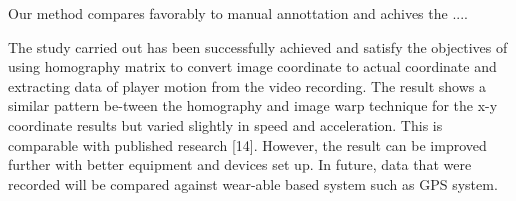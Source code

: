Our method compares favorably to manual annottation and achives the ....


The study carried  out has been successfully achieved and satisfy the objectives of using homography 
matrix to convert image coordinate to  actual coordinate and  extracting data of  player motion 
from the video recording. The result shows a similar pattern be-tween the homography and image warp 
technique for the x-y coordinate results but varied slightly in speed and acceleration. 
This is comparable with published research  [14]. However, the  result can be improved further 
with better equipment and devices set up. In future, data that were recorded will be compared 
against wear-able based system such as GPS system. 